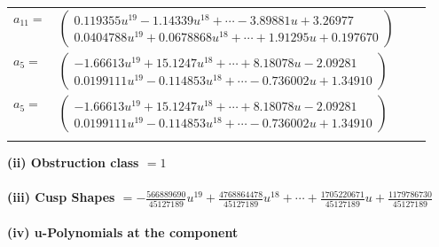 \documentclass[1p]{elsarticle_modified}
\theoremstyle{definition}
\begin{document}
\begin{tabular}{m{7pt} m{180pt} m{7pt} m{180pt} }
\flushright $a_{11}=$&$\begin{pmatrix}0.119355 u^{19}-1.14339 u^{18}+\cdots-3.89881 u+3.26977\\0.0404788 u^{19}+0.0678868 u^{18}+\cdots+1.91295 u+0.197670\end{pmatrix}$ \\
\flushright $a_{5}=$&$\begin{pmatrix}-1.66613 u^{19}+15.1247 u^{18}+\cdots+8.18078 u-2.09281\\0.0199111 u^{19}-0.114853 u^{18}+\cdots-0.736002 u+1.34910\end{pmatrix}$\\ \flushright $a_{5}=$&$\begin{pmatrix}-1.66613 u^{19}+15.1247 u^{18}+\cdots+8.18078 u-2.09281\\0.0199111 u^{19}-0.114853 u^{18}+\cdots-0.736002 u+1.34910\end{pmatrix}$\\&\end{tabular}
\flushleft \textbf{(ii) Obstruction class $= 1$}\\~\\
\flushleft \textbf{(iii) Cusp Shapes $= -\frac{566889690}{45127189} u^{19}+\frac{4768864478}{45127189} u^{18}+\cdots+\frac{1705220671}{45127189} u+\frac{1179786730}{45127189}$}\\~\\
\newpage\renewcommand{\arraystretch}{1}
\flushleft \textbf{(iv) u-Polynomials at the component}\newline \\
\end{document}
